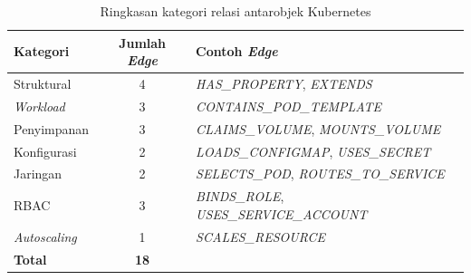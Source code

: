 ﻿\renewcommand{\arraystretch}{1.3}
\captionsetup[table]{justification=raggedright,singlelinecheck=false}
\begin{table}[H]
\caption{Ringkasan kategori relasi antarobjek Kubernetes}
\label{tbl:edge_category_summary}
\begin{tabular}{| p{} | c | p{} |}
\hline
\textbf{Kategori} & \textbf{Jumlah \textit{Edge}} & \textbf{Contoh \textit{Edge}} \\
\hline
Struktural & 4 & \textit{HAS\_PROPERTY}, \textit{EXTENDS} \\
\hline
\textit{Workload} & 3 & \textit{CONTAINS\_POD\_TEMPLATE} \\
\hline
Penyimpanan & 3 & \textit{CLAIMS\_VOLUME}, \textit{MOUNTS\_VOLUME} \\
\hline
Konfigurasi & 2 & \textit{LOADS\_CONFIGMAP}, \textit{USES\_SECRET} \\
\hline
Jaringan & 2 & \textit{SELECTS\_POD}, \textit{ROUTES\_TO\_SERVICE} \\
\hline
RBAC & 3 & \textit{BINDS\_ROLE}, \textit{USES\_SERVICE\_ACCOUNT} \\
\hline
\textit{Autoscaling} & 1 & \textit{SCALES\_RESOURCE} \\
\hline
\textbf{Total} & \textbf{18} & \\
\hline
\end{tabular}
\end{table}